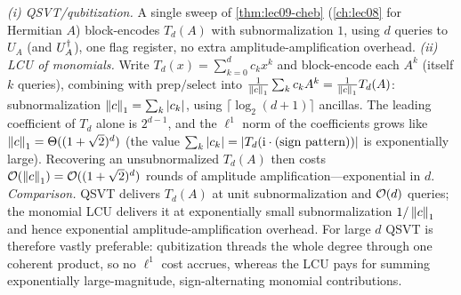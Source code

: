 \begin{solution}
\emph{(i) QSVT/qubitization.} A single sweep of \cref{thm:lec09-cheb}
(\cref{ch:lec08} for Hermitian $A$) block-encodes $T_d(A)$ with subnormalization $1$,
using $d$ queries to $U_A$ (and $U_A^{\dagger}$), one flag register, no extra
amplitude-amplification overhead.
\emph{(ii) LCU of monomials.} Write $T_d(x)=\sum_{k=0}^d c_k x^k$ and block-encode each
$A^k$ (itself $k$ queries), combining with $\mathrm{prep}/\mathrm{select}$ into
$\tfrac1{\left\lVert c \right\rVert_1}\sum_k c_k A^k=\tfrac1{\left\lVert c \right\rVert_1}T_d(A)$: subnormalization
$\left\lVert c \right\rVert_1=\sum_k\left\lvert c_k \right\rvert$, using $\lceil\log_2(d+1)\rceil$ ancillas. The leading
coefficient of $T_d$ alone is $2^{d-1}$, and the $\ell^1$ norm of the coefficients grows
like $\left\lVert c \right\rVert_1=\Theta((1+\sqrt2)^d)$ (the value $\sum_k\left\lvert c_k \right\rvert=\left\lvert T_d(\mathrm{i}\cdot
(\text{sign pattern})) \right\rvert$ is exponentially large). Recovering an unsubnormalized
$T_d(A)$ then costs $\mathcal{O}(\left\lVert c \right\rVert_1)=\mathcal{O}((1+\sqrt2)^d)$ rounds of amplitude
amplification---exponential in $d$.
\emph{Comparison.} QSVT delivers $T_d(A)$ at unit subnormalization and $\mathcal{O}(d)$
queries; the monomial LCU delivers it at exponentially small subnormalization
$1/\left\lVert c \right\rVert_1$ and hence exponential amplitude-amplification overhead. For large $d$
QSVT is therefore vastly preferable: qubitization threads the whole degree through one
coherent product, so no $\ell^1$ cost accrues, whereas the LCU pays for summing
exponentially large-magnitude, sign-alternating monomial contributions.
\end{solution}
